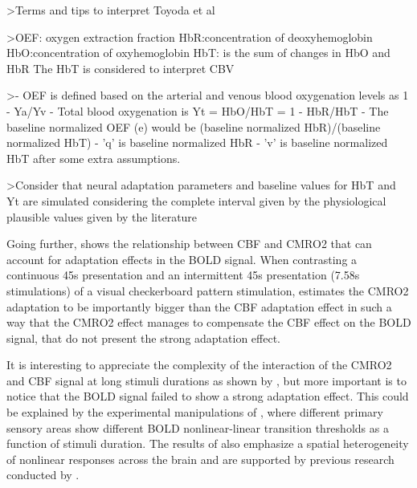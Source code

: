 >Terms and tips to interpret Toyoda et al

>OEF: oxygen extraction fraction  
HbR:concentration of deoxyhemoglobin
HbO:concentration of oxyhemoglobin  
HbT: is the sum of changes in HbO and HbR  
The HbT is considered to interpret CBV

>- OEF is defined based on the arterial and venous blood oxygenation levels as 1 - Ya/Yv  
- Total blood oxygenation is Yt = HbO/HbT = 1 - HbR/HbT  
- The baseline normalized OEF (e) would be (baseline normalized HbR)/(baseline normalized HbT)  
- 'q' is baseline normalized HbR  
- 'v' is baseline normalized HbT after some extra assumptions.

>Consider that neural adaptation parameters and baseline values for HbT and Yt are simulated considering the complete interval given by the physiological plausible values given by the literature




Going further, \citep{moradi_adaptation_2013} shows the relationship between CBF and CMRO2 that can account for adaptation effects in the BOLD signal. When contrasting a continuous 45s presentation and an intermittent 45s presentation (7.58s stimulations) of a visual checkerboard pattern stimulation, \citep{moradi_adaptation_2013} estimates the CMRO2 adaptation to be importantly bigger than the CBF adaptation effect in such a way that the CMRO2 effect manages to compensate the CBF effect on the BOLD signal, that do not present the strong adaptation effect.


It is interesting to appreciate the complexity of the interaction of the CMRO2 and CBF signal at long stimuli durations as shown by \citep{moradi_adaptation_2013}, but more important is to notice that the BOLD signal failed to show a strong adaptation effect. This could be explained by the experimental manipulations of \citep{soltysik_comparison_2004}, where different primary sensory areas show different BOLD nonlinear-linear transition thresholds as a function of stimuli duration. The results of \citep{soltysik_comparison_2004} also emphasize a spatial heterogeneity of nonlinear responses across the brain and are supported by previous research conducted by \citep{birn_spatial_2001}. 

